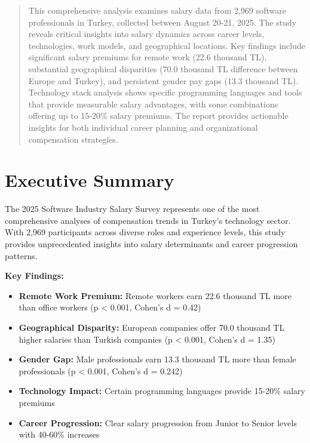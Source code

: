 \documentclass[12pt,a4paper]{article}
\begin{document}
\maketitle

\begin{abstract}
This comprehensive analysis examines salary data from 2,969 software professionals in Turkey, collected between August 20-21, 2025. The study reveals critical insights into salary dynamics across career levels, technologies, work models, and geographical locations. Key findings include significant salary premiums for remote work (22.6 thousand TL), substantial geographical disparities (70.0 thousand TL difference between Europe and Turkey), and persistent gender pay gaps (13.3 thousand TL). Technology stack analysis shows specific programming languages and tools that provide measurable salary advantages, with some combinations offering up to 15-20\% salary premiums. The report provides actionable insights for both individual career planning and organizational compensation strategies.
\end{abstract}

\section{Executive Summary}

The 2025 Software Industry Salary Survey represents one of the most comprehensive analyses of compensation trends in Turkey's technology sector. With 2,969 participants across diverse roles and experience levels, this study provides unprecedented insights into salary determinants and career progression patterns.

\textbf{Key Findings:}
\begin{itemize}
    \item \textbf{Remote Work Premium:} Remote workers earn 22.6 thousand TL more than office workers (p < 0.001, Cohen's d = 0.42)
    \item \textbf{Geographical Disparity:} European companies offer 70.0 thousand TL higher salaries than Turkish companies (p < 0.001, Cohen's d = 1.35)
    \item \textbf{Gender Gap:} Male professionals earn 13.3 thousand TL more than female professionals (p < 0.001, Cohen's d = 0.242)
    \item \textbf{Technology Impact:} Certain programming languages provide 15-20\% salary premiums
    \item \textbf{Career Progression:} Clear salary progression from Junior to Senior levels with 40-60\% increases
\end{itemize}
\end{document}
